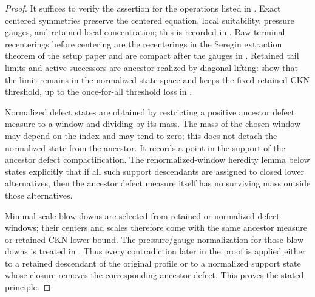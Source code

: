 \documentclass[11pt]{amsart}
\numberwithin{equation}{section}
\theoremstyle{plain}
\theoremstyle{definition}
\theoremstyle{remark}
\begin{document}
\begin{proof}
It suffices to verify the assertion for the operations listed in
.  Exact centered
symmetries preserve the centered equation, local suitability, pressure gauges,
and retained local concentration; this is recorded in
.
Raw terminal recenterings before centering are the recenterings in the Seregin
extraction theorem of the setup paper and are compact after the gauges in
.  Retained tail limits and active
successors are ancestor-realized by diagonal lifting:
 show that the
limit remains in the normalized state space and keeps the fixed retained CKN
threshold, up to the once-for-all threshold loss in
.

Normalized defect states are obtained by restricting a positive ancestor defect
measure to a window and dividing by its mass.  The mass of the chosen window may
depend on the index and may tend to zero; this does not detach the normalized
state from the ancestor.  It records a point in the support of the ancestor
defect compactification.  The renormalized-window heredity lemma
 below states explicitly that if all
such support descendants are assigned to closed lower alternatives, then the
ancestor defect measure itself has no surviving mass outside those alternatives.

Minimal-scale blow-downs are selected from retained or normalized defect windows;
their centers and scales therefore come with the same ancestor measure or
retained CKN lower bound.  The pressure/gauge normalization for those blow-downs
is treated in
.
Thus every contradiction later in the proof is applied either to a retained
descendant of the original profile or to a normalized support state whose
closure removes the corresponding ancestor defect.  This proves the stated
principle.
\end{proof}
\end{document}
